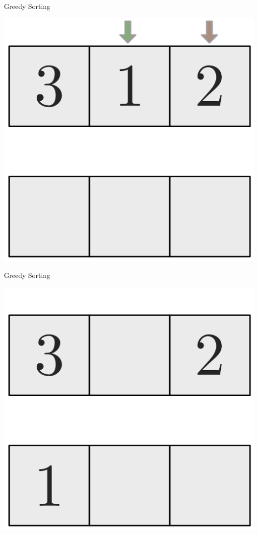 \documentclass[10pt]{beamer}
\begin{document}
\begin{frame}[fragile]{Greedy Sorting}
    \begin{center}
        \includegraphics[height=.4\textheight]{Images/Bubblesort/Bubblesort_05}
    \end{center}
\end{frame}

\begin{frame}[fragile]{Greedy Sorting}
    \begin{center}
        \includegraphics[height=.4\textheight]{Images/Bubblesort/Bubblesort_06}
    \end{center}
\end{frame}
\end{document}
